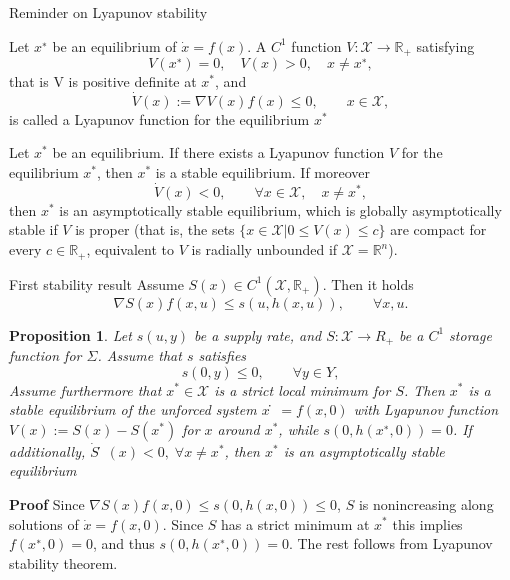 \documentclass[aspectratio=169]{beamer}
\newcommand{\bbR}{\mathbb{R}}
\newtheorem{proposition}{Proposition}
\begin{document}
\begin{frame}{Reminder on Lyapunov stability}
	
	\begin{definition}
	Let $x^∗$ be an equilibrium of $\dot{x} = f(x)$. A $C^1$ function $V : \mathcal{X}\rightarrow \bbR_+$
	satisfying
	\begin{equation*}
		V(x^∗) = 0, \quad V(x) > 0, \quad x \neq x^∗,
	\end{equation*}
	that is V is positive definite at $x^*$, and
	\begin{equation*}
	\dot{V}(x) := \nabla V(x) f(x) \le 0, \qquad x \in \mathcal{X},
	\end{equation*}
	is called a Lyapunov function for the equilibrium $x^*$
	\end{definition}

\begin{theorem}
	Let $x^*$ be an equilibrium. If there exists a Lyapunov function $V$
	for the equilibrium $x^*$, then $x^*$ is a stable equilibrium. If moreover
	\begin{equation*}
		\dot{V}(x) <0, \qquad \forall x \in \mathcal{X}, \quad x\neq x^*,
	\end{equation*}
	then $x^*$ is an asymptotically stable equilibrium, which is globally asymptotically
	stable if $V$ is proper (that is, the sets $\{x \in \mathcal{X} | 0 \le V (x) \le c\}$ are compact for every
	$c \in \bbR_+$, equivalent to $V$ is radially unbounded if $\mathcal{X} = \bbR^n$).
\end{theorem}
\end{frame}

\begin{frame}{First stability result}
	Assume $S(x) \in C^1(\mathcal{X}, \bbR_+)$. Then it holds
	\begin{equation*}
		\nabla S(x) f(x, u) \le s(u, h(x, u)), \qquad \forall x, u. 
	\end{equation*}

	\begin{proposition}
		Let $s(u, y)$ be a supply rate, and $S : \mathcal{X} \rightarrow R_+$ be a $C^1$ storage
		function for $\Sigma$. Assume that $s$ satisfies
		\begin{equation*}
			s(0, y) \le 0, \qquad \forall y \in Y,
		\end{equation*}
		Assume furthermore that $x^* \in \mathcal{X}$ is a strict local minimum for $S$. Then $x^*$ is a stable
		equilibrium of the unforced system $ẋ = f (x, 0)$ with Lyapunov function $V(x):=
		S(x) - S(x^*)$ for $x$ around $x^*$, while $s(0, h(x^∗, 0)) = 0$. If additionally, $\dot{S}̇(x) < 0, \; \forall x \neq x^*$, then $x^*$ is an asymptotically stable equilibrium
	\end{proposition}
\textbf{Proof} Since $\nabla S(x) f(x, 0) \le s(0, h(x, 0)) \le 0$, $S$ is nonincreasing along solutions of $\dot{x}=f(x,0)$. Since $S$ has a strict minimum at $x^*$ this
implies $f(x^∗ , 0) = 0$, and thus $s(0, h(x^∗, 0)) = 0$. The rest follows from Lyapunov stability theorem.
	
\end{frame}
\end{document}

